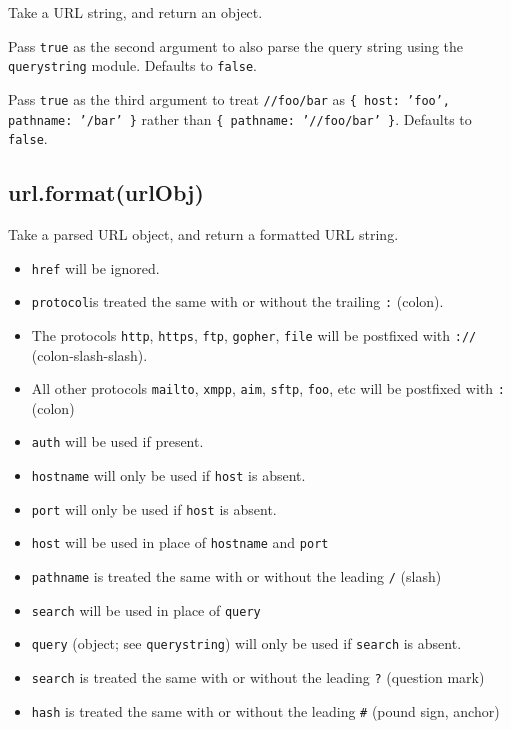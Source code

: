 Take a URL string, and return an object.

Pass \texttt{true} as the second argument to also parse the query string
using the \texttt{querystring} module. Defaults to \texttt{false}.

Pass \texttt{true} as the third argument to treat \texttt{//foo/bar} as
\texttt{\{ host: 'foo', pathname: '/bar' \}} rather than
\texttt{\{ pathname: '//foo/bar' \}}. Defaults to \texttt{false}.

\subsection{url.format(urlObj)}\label{url.formaturlobj}

Take a parsed URL object, and return a formatted URL string.

\begin{itemize}
\itemsep1pt\parskip0pt
\item
  \texttt{href} will be ignored.
\item
  \texttt{protocol}is treated the same with or without the trailing
  \texttt{:} (colon).
\item
  The protocols \texttt{http}, \texttt{https}, \texttt{ftp},
  \texttt{gopher}, \texttt{file} will be postfixed with \texttt{://}
  (colon-slash-slash).
\item
  All other protocols \texttt{mailto}, \texttt{xmpp}, \texttt{aim},
  \texttt{sftp}, \texttt{foo}, etc will be postfixed with \texttt{:}
  (colon)
\item
  \texttt{auth} will be used if present.
\item
  \texttt{hostname} will only be used if \texttt{host} is absent.
\item
  \texttt{port} will only be used if \texttt{host} is absent.
\item
  \texttt{host} will be used in place of \texttt{hostname} and
  \texttt{port}
\item
  \texttt{pathname} is treated the same with or without the leading
  \texttt{/} (slash)
\item
  \texttt{search} will be used in place of \texttt{query}
\item
  \texttt{query} (object; see \texttt{querystring}) will only be used if
  \texttt{search} is absent.
\item
  \texttt{search} is treated the same with or without the leading
  \texttt{?} (question mark)
\item
  \texttt{hash} is treated the same with or without the leading
  \texttt{\#} (pound sign, anchor)
\end{itemize}

